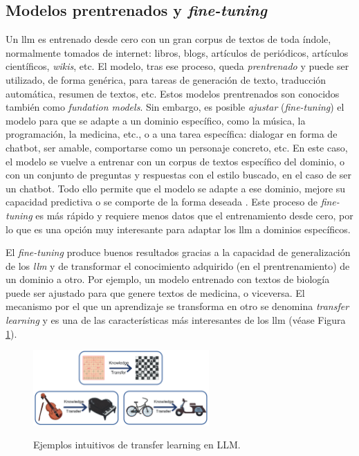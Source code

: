 \subsection{Modelos prentrenados y \emph{fine-tuning}} 
Un \gls{llm} es entrenado desde cero con un gran corpus de textos de toda índole, normalmente tomados de internet: libros, blogs, artículos de periódicos, artículos científicos, \emph{wikis}, etc. El modelo, tras ese proceso, queda \emph{prentrenado} \citep{hanPreTrainedModelsPresent2021} y puede ser utilizado, de forma genérica, para tareas de generación de texto, traducción automática, resumen de textos, etc. Estos modelos prentrenados son conocidos también como \emph{fundation models}. Sin embargo, es posible \emph{ajustar} (\emph\emph{fine-tuning}) el modelo para que se adapte a un dominio específico, como la música, la programación, la medicina, etc., o a una tarea específica: dialogar en forma de {chatbot}, ser amable, comportarse como un personaje concreto, etc. En este caso, el modelo se vuelve a entrenar con un corpus de textos específico del dominio, o con un conjunto de preguntas y respuestas con el estilo buscado, en el caso de ser un {chatbot}. Todo ello permite que el modelo se adapte a ese dominio, mejore su capacidad predictiva o se comporte de la forma deseada \citep{tianFinetuningLanguageModels2023}. Este proceso de \emph{fine-tuning} es más rápido y requiere menos datos que el entrenamiento desde cero, por lo que es una opción muy interesante para adaptar los \gls{llm} a dominios específicos.

El \emph{fine-tuning} produce buenos resultados gracias a la capacidad de generalización de los \emph{llm} y de transformar el conocimiento adquirido (en el prentrenamiento) de un dominio a otro. Por ejemplo, un modelo entrenado con textos de biología puede ser {ajustado} para que genere textos de medicina, o viceversa. El mecanismo por el que un aprendizaje se transforma en otro se denomina \emph{transfer learning} \citep{zhuangComprehensiveSurveyTransfer2020} y es una de las características más interesantes de los \gls{llm} (véase Figura \ref{fig:transfer_learning}).

\begin{figure}[H]
    \caption[Ejemplos intuitivos de {transfer learning} en LLM]{Ejemplos intuitivos de {transfer learning} en LLM.}
    \centering
    \includegraphics[width=0.6\textwidth]{./figuras/transfer_learning.png}
    \label{fig:transfer_learning}
\end{figure}


